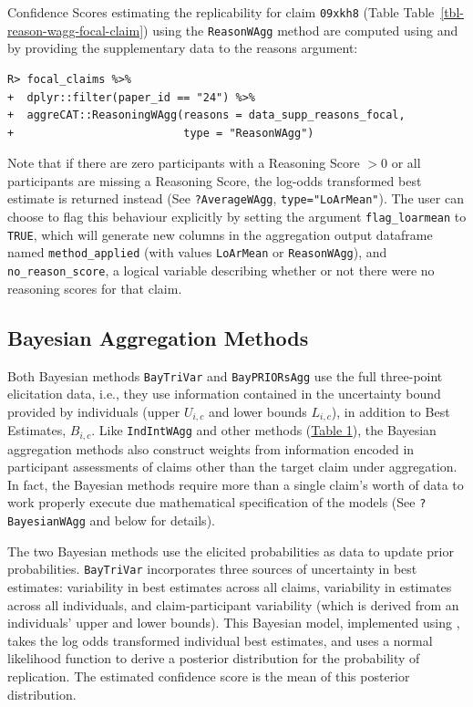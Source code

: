 \documentclass[article]{jss}
\newcommand{\fct}[1]{\code{#1()}}
\begin{document}
Confidence Scores estimating the replicability for claim \texttt{09xkh8}
(Table Table~\ref{tbl-reason-wagg-focal-claim}) using the
\texttt{ReasonWAgg} method are computed using \fct{ReasoningWAgg} and by
providing the supplementary data to the {reasons} argument:

\begin{verbatim}
R> focal_claims %>% 
+  dplyr::filter(paper_id == "24") %>% 
+  aggreCAT::ReasoningWAgg(reasons = data_supp_reasons_focal,
+                          type = "ReasonWAgg")
\end{verbatim}

Note that if there are zero participants with a Reasoning Score \(>0\)
or all participants are missing a Reasoning Score, the log-odds
transformed best estimate is returned instead (See
\texttt{?AverageWAgg}, \texttt{type="LoArMean"}). The user can choose to
flag this behaviour explicitly by setting the argument
\texttt{flag\_loarmean} to \texttt{TRUE}, which will generate new
columns in the aggregation output dataframe named
\texttt{method\_applied} (with values \texttt{LoArMean} or
\texttt{ReasonWAgg}), and \texttt{no\_reason\_score}, a logical variable
describing whether or not there were no reasoning scores for that claim.

\hypertarget{bayesian-aggregation-methods}{%
\subsection{Bayesian Aggregation
Methods}\label{bayesian-aggregation-methods}}

Both Bayesian methods \texttt{BayTriVar} and \texttt{BayPRIORsAgg} use
the full three-point elicitation data, i.e., they use information
contained in the uncertainty bound provided by individuals (upper
\({U}_{i,c}\) and lower bounds \({L}_{i,c}\)), in addition to Best
Estimates, \(B_{i,c}\). Like \texttt{IndIntWAgg} and other methods
(\protect\hyperlink{table1}{Table 1}), the Bayesian aggregation methods
also construct weights from information encoded in participant
assessments of claims other than the target claim under aggregation. In
fact, the Bayesian methods require more than a single claim's worth of
data to work properly execute due mathematical specification of the
models (See \texttt{?BayesianWAgg} and below for details).

The two Bayesian methods use the elicited probabilities as data to
update prior probabilities. \texttt{BayTriVar} incorporates three
sources of uncertainty in best estimates: variability in best estimates
across all claims, variability in estimates across all individuals, and
claim-participant variability (which is derived from an individuals'
upper and lower bounds). This Bayesian model, implemented using
\citep{R2JAGS}, takes the log odds transformed individual
best estimates, and uses a normal likelihood function to derive a
posterior distribution for the probability of replication. The estimated
confidence score is the mean of this posterior distribution.
\end{document}
